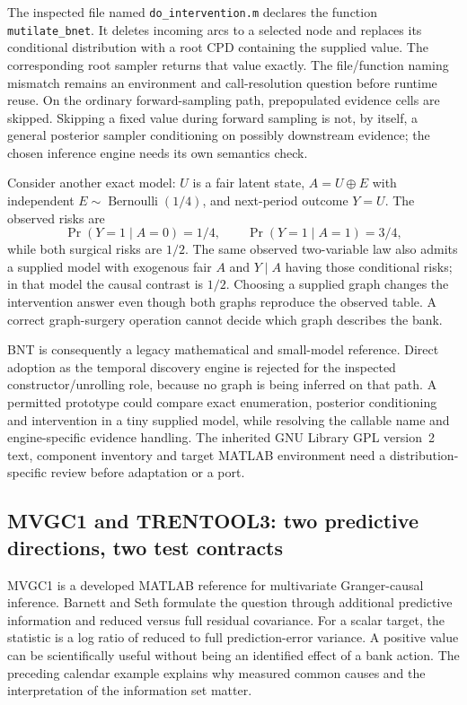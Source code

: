The inspected file named \texttt{do\_intervention.m} declares the function
\texttt{mutilate\_bnet}. It deletes incoming arcs to a selected node and
replaces its conditional distribution with a root CPD containing the supplied
value. The corresponding root sampler returns that value exactly.
The file/function naming mismatch remains an environment and call-resolution
question before runtime reuse. On the ordinary forward-sampling path,
prepopulated evidence cells are skipped. Skipping a fixed value during forward
sampling is not, by itself, a general posterior sampler conditioning on
possibly downstream evidence; the chosen inference engine needs its own
semantics check.
\citep{exec17_temporal_bnt}

Consider another exact model: $U$ is a fair latent state,
$A=U\oplus E$ with independent $E\sim\operatorname{Bernoulli}(1/4)$, and
next-period outcome $Y=U$. The observed risks are
\[
 \Pr(Y=1\mid A=0)=1/4,\qquad
 \Pr(Y=1\mid A=1)=3/4,
\]
while both surgical risks are $1/2$. The same observed two-variable law
also admits a supplied model with exogenous fair $A$ and
$Y\mid A$ having those conditional risks; in that model the causal contrast
is $1/2$. Choosing a supplied graph changes the intervention answer even
though both graphs reproduce the observed table. A correct graph-surgery
operation cannot decide which graph describes the bank.
\citep{exec17_temporal_oracle}

BNT is consequently a legacy mathematical and small-model reference.
Direct adoption as the temporal discovery engine is rejected for the
inspected constructor/unrolling role, because no graph is being inferred on
that path. A permitted prototype could compare exact enumeration, posterior
conditioning and intervention in a tiny supplied model, while resolving the
callable name and engine-specific evidence handling. The inherited GNU
Library GPL version~2 text, component inventory and target MATLAB environment
need a distribution-specific review before adaptation or a port.
\citep{exec17_temporal_bnt}

\subsection{MVGC1 and TRENTOOL3: two predictive directions, two test contracts}

MVGC1 is a developed MATLAB reference for multivariate Granger-causal
inference. Barnett and Seth formulate the question through additional
predictive information and reduced versus full residual covariance.
For a scalar target, the statistic is a log ratio of reduced to full
prediction-error variance. A positive value can be scientifically useful
without being an identified effect of a bank action. The preceding calendar
example explains why measured common causes and the interpretation of the
information set matter.
\citep{exec17_temporal_mvgc_paper}

